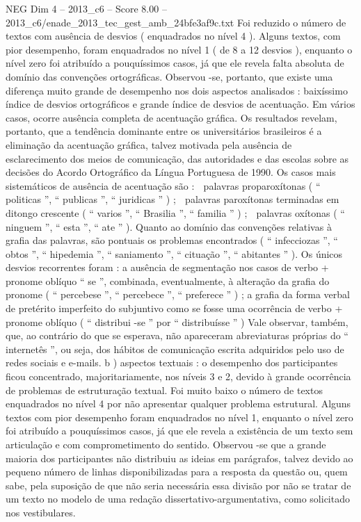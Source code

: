\begin{textsample}{NEG Dim 4 – 2013\_c6 – Score 8.00 – 2013\_c6/enade\_2013\_tec\_gest\_amb\_24bfe3af9c.txt}
Foi reduzido o número de textos com ausência de desvios ( enquadrados no nível 4 ).
Alguns textos, com pior desempenho, foram enquadrados no nível 1 ( de 8 a 12 desvios ), enquanto o nível zero foi atribuído a pouquíssimos casos, já que ele revela falta absoluta de domínio das convenções ortográficas.
Observou -se, portanto, que existe uma diferença muito grande de desempenho nos dois aspectos analisados : baixíssimo índice de desvios ortográficos e grande índice de desvios de acentuação.
Em vários casos, ocorre ausência completa de acentuação gráfica.
Os resultados revelam, portanto, que a tendência dominante entre os universitários brasileiros é a eliminação da acentuação gráfica, talvez motivada pela ausência de esclarecimento dos meios de comunicação, das autoridades e das escolas sobre as decisões do Acordo Ortográfico da Língua Portuguesa de 1990.
Os casos mais sistemáticos de ausência de acentuação são :  palavras proparoxítonas ( “ politicas ”, “ publicas ”, “ juridicas ” ) ;  palavras paroxítonas terminadas em ditongo crescente ( “ varios ”, “ Brasilia ”, “ familia ” ) ;  palavras oxítonas ( “ ninguem ”, “ esta ”, “ ate ” ).
Quanto ao domínio das convenções relativas à grafia das palavras, são pontuais os problemas encontrados ( “ infecciozas ”, “ obtos ”, “ hipedemia ”, “ saniamento ”, “ cituação ”, “ abitantes ” ).
Os únicos desvios recorrentes foram : a ausência de segmentação nos casos de verbo + pronome oblíquo “ se ”, combinada, eventualmente, à alteração da grafia do pronome ( “ percebese ”, “ percebece ”, “ preferece ” ) ; a grafia da forma verbal de pretérito imperfeito do subjuntivo como se fosse uma ocorrência de verbo + pronome oblíquo ( “ distribui -se ” por “ distribuísse ” ) Vale observar, também, que, ao contrário do que se esperava, não apareceram abreviaturas próprias do “ internetês ”, ou seja, dos hábitos de comunicação escrita adquiridos pelo uso de redes sociais e e-mails. b ) aspectos textuais : o desempenho dos participantes ficou concentrado, majoritariamente, nos níveis 3 e 2, devido à grande ocorrência de problemas de estruturação textual.
Foi muito baixo o número de textos enquadrados no nível 4 por não apresentar qualquer problema estrutural.
Alguns textos com pior desempenho foram enquadrados no nível 1, enquanto o nível zero foi atribuído a pouquíssimos casos, já que ele revela a existência de um texto sem articulação e com comprometimento do sentido.
Observou -se que a grande maioria dos participantes não distribuiu as ideias em parágrafos, talvez devido ao pequeno número de linhas disponibilizadas para a resposta da questão ou, quem sabe, pela suposição de que não seria necessária essa divisão por não se tratar de um texto no modelo de uma redação dissertativo-argumentativa, como solicitado nos vestibulares.

\end{textsample}
